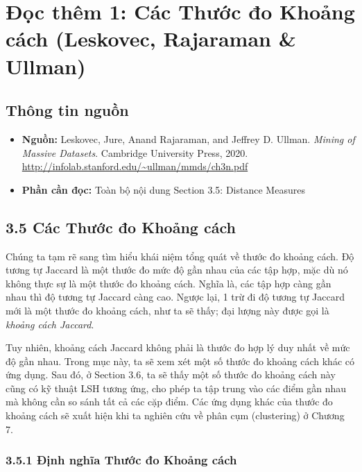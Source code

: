 \chapter{Đọc thêm 1: Các Thước đo Khoảng cách (Leskovec, Rajaraman \& Ullman)}
\label{ch:M4L1DT1}


\section{Thông tin nguồn}

\begin{itemize}
  \item \textbf{Nguồn:} Leskovec, Jure, Anand Rajaraman, and Jeffrey D. Ullman. \emph{Mining of Massive Datasets}. Cambridge University Press, 2020. \url{http://infolab.stanford.edu/~ullman/mmds/ch3n.pdf}
  \item \textbf{Phần cần đọc:} Toàn bộ nội dung Section 3.5: Distance Measures
\end{itemize}

\section{3.5 Các Thước đo Khoảng cách}

Chúng ta tạm rẽ sang tìm hiểu khái niệm tổng quát về thước đo khoảng cách. Độ tương tự Jaccard là một thước đo mức độ gần nhau của các tập hợp, mặc dù nó không thực sự là một thước đo khoảng cách. Nghĩa là, các tập hợp càng gần nhau thì độ tương tự Jaccard càng cao. Ngược lại, 1 trừ đi độ tương tự Jaccard mới là một thước đo khoảng cách, như ta sẽ thấy; đại lượng này được gọi là \emph{khoảng cách Jaccard}.

Tuy nhiên, khoảng cách Jaccard không phải là thước đo hợp lý duy nhất về mức độ gần nhau. Trong mục này, ta sẽ xem xét một số thước đo khoảng cách khác có ứng dụng. Sau đó, ở Section 3.6, ta sẽ thấy một số thước đo khoảng cách này cũng có kỹ thuật LSH tương ứng, cho phép ta tập trung vào các điểm gần nhau mà không cần so sánh tất cả các cặp điểm. Các ứng dụng khác của thước đo khoảng cách sẽ xuất hiện khi ta nghiên cứu về phân cụm (clustering) ở Chương 7.

\subsection*{3.5.1 Định nghĩa Thước đo Khoảng cách}

